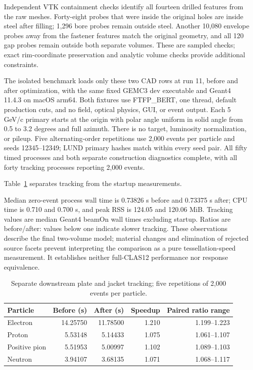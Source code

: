 Independent VTK containment checks identify all fourteen drilled features from the raw meshes. Forty-eight
probes that were inside the original holes are inside steel after filling; 1,296 bore probes remain outside
steel. Another 10,080 envelope probes away from the fastener features match the original geometry, and all 120
gap probes remain outside both separate volumes. These are sampled checks; exact rim-coordinate preservation
and analytic volume checks provide additional constraints.

The isolated benchmark loads only these two CAD rows at run 11, before and after optimization, with the same
fixed GEMC3 dev executable and Geant4 11.4.3 on macOS arm64. Both fixtures use FTFP\_BERT, one thread, default
production cuts, and no field, optical physics, GUI, or event output. Each 5 GeV/c primary starts at the
origin with polar angle uniform in solid angle from 0.5 to 3.2 degrees and full azimuth. There is no target,
luminosity normalization, or pileup. Five alternating-order repetitions use 2,000 events per particle and
seeds 12345--12349; LUND primary hashes match within every seed pair. All fifty timed processes and both
separate construction diagnostics complete, with all forty tracking processes reporting 2,000 events.

Table~\ref{tab:magnets-plate-tracking} separates tracking from the startup measurements.

Median zero-event process wall time is 0.73826 s before and 0.73375 s after; CPU time is 0.710 and 0.700 s,
and peak RSS is 124.05 and 120.06 MiB. Tracking values are median Geant4 beamOn wall times excluding startup.
Ratios are before/after: values below one indicate slower tracking. These observations describe the final
two-volume model; material changes and elimination of rejected source facets prevent interpreting the
comparison as a pure tessellation-speed measurement. It establishes neither full-CLAS12 performance nor
response equivalence.

\begin{table}[htbp]
\centering
\setlength{\tabcolsep}{8pt}
\caption{Separate downstream plate and jacket tracking; five repetitions of 2,000 events per particle.}
\label{tab:magnets-plate-tracking}
\begin{tabular}{lrrrr}
\toprule
Particle & Before (s) & After (s) & Speedup & Paired ratio range \\
\midrule
Electron & 14.25750 & 11.78500 & 1.210 & 1.199--1.223 \\
Proton & 5.53148 & 5.14433 & 1.075 & 1.061--1.107 \\
Positive pion & 5.51953 & 5.00997 & 1.102 & 1.089--1.103 \\
Neutron & 3.94107 & 3.68135 & 1.071 & 1.068--1.117 \\
\bottomrule
\end{tabular}
\end{table}

